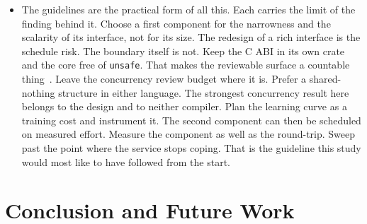 \documentclass[english,twoside,openright,a4paper,censored,csm,software-track-2020]{HYthesisML}
\begin{document}
\begin{itemize}
        reading its wording invites. It is accepted for memory safety and data-race freedom and
        rejected for concurrency correctness at large. H3 is supported by the bound on a cost the
        measurement could have missed, not by the failure to detect one. Three threats stay
        load-bearing behind all of it. One author wrote both implementations. The parity suite
        bounds behaviour and not performance~\cite{emberg2023asn1}. The end-to-end instrument
        measures the design faithfully and the language barely at all. The overload divergence
        is replicated with its mechanism narrowed and not closed.
  \item The guidelines are the practical form of all this. Each carries the limit of the
        finding behind it. Choose a first component for the narrowness and the scalarity of its
        interface, not for its size. The redesign of a rich interface is the schedule risk. The
        boundary itself is not. Keep the C ABI in its own crate and the core free of
        \texttt{unsafe}. That makes the reviewable surface a countable
        thing~\cite{evans2020rust}. Leave the concurrency review budget where it is. Prefer a
        shared-nothing structure in either language. The strongest concurrency result here
        belongs to the design and to neither compiler. Plan the learning curve as a training
        cost and instrument it. The second component can then be scheduled on measured effort.
        Measure the component as well as the round-trip. Sweep past the point where the service
        stops coping. That is the guideline this study would most like to have followed from the
        start.
\end{itemize}

\chapter{Conclusion and Future Work\label{chapter:conclusions}}
\end{document}
